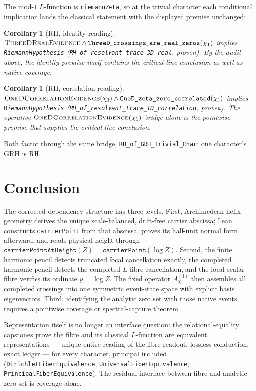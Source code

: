 \documentclass[11pt]{article}
\newtheorem{corollary}[theorem]{Corollary}
\theoremstyle{definition}
\begin{document}
The mod-\(1\) \(L\)-function is \texttt{riemannZeta}, so at the trivial
character each conditional implication lands the classical statement with
the displayed premise unchanged:

\begin{corollary}[RH, identity reading]\label{cor:grh-rhA}
\(\textsc{ThreeDRealEvidence}\wedge
\texttt{ThreeD\_crossings\_are\_real\_zeros}(\chi_1)\)
implies \texttt{RiemannHypothesis}
(\texttt{RH\_of\_resolvant\_trace\_3D\_real}, proven).
By the audit above, the identity premise itself contains the
critical-line conclusion as well as native coverage.
\end{corollary}

\begin{corollary}[RH, correlation reading]\label{cor:grh-rhB}
\(\textsc{OneDCorrelationEvidence}(\chi_1)\wedge
\texttt{OneD\_zeta\_zero\_correlated}(\chi_1)\)
implies \texttt{RiemannHypothesis}
(\texttt{RH\_of\_resolvant\_trace\_1D\_correlation}, proven).
The operative \(\textsc{OneDCorrelationEvidence}(\chi_1)\) bridge alone is
the pointwise premise that supplies the critical-line conclusion.
\end{corollary}

Both factor through the same bridge, \texttt{RH\_of\_GRH\_Trivial\_Char}:
one character's GRH is RH.

\section{Conclusion}\label{sec:grh-conclusion}

The corrected dependency structure has three levels.  First, Archimedean
helix geometry derives the unique scale-balanced, drift-free carrier
abscissa; Lean constructs \texttt{carrierPoint} from that abscissa, proves
its half-unit normal form afterward, and reads physical height through
\(\texttt{carrierPointAtHeight}(Z)=\texttt{carrierPoint}(\log Z)\).  Second,
the finite harmonic pencil detects truncated focal cancellation exactly, the
completed harmonic pencil detects the completed \(L\)-fibre cancellation,
and the local scalar fibre verifies its ordinate \(y=\log Z\).  The fixed
operator \(A^{(3)}_\chi\) then assembles all completed crossings into one
symmetric event-state space with explicit basis eigenvectors.  Third,
identifying the analytic zero set with those native events requires a
pointwise coverage or spectral-capture theorem.

Representation itself is no longer an interface question: the
relational-equality capstones prove the fibre and its classical
\(L\)-function are equivalent representations --- unique entire reading of
the fibre readout, lossless conduction, exact ledger --- for every
character, principal included (\texttt{DirichletFiberEquivalence},
\texttt{UniversalFiberEquivalence}, \texttt{PrincipalFiberEquivalence}).
The residual interface between fibre and analytic zero set is coverage
alone.
\end{document}
